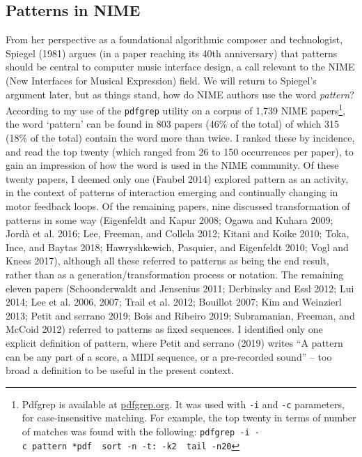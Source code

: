 \documentclass{nime-alternate} %
\begin{document}
\hypertarget{patterns-in-nime}{%
\subsection{Patterns in NIME}\label{patterns-in-nime}}

From her perspective as a foundational algorithmic composer and
technologist, Spiegel (1981) argues (in a paper reaching its 40th
anniversary) that patterns should be central to computer music interface
design, a call relevant to the NIME (New Interfaces for Musical
Expression) field. We will return to Spiegel's argument later, but as
things stand, how do NIME authors use the word \emph{pattern}? According
to my use of the \texttt{pdfgrep} utility on a corpus of 1,739 NIME
papers\footnote{ Pdfgrep is available at
  \href{https://pdfgrep.org/}{pdfgrep.org}. It was used with \texttt{-i}
  and \texttt{-c} parameters, for case-insensitive matching. For
  example, the top twenty in terms of number of matches was found with
  the following:
  \texttt{pdfgrep\ -i\ -c\ pattern\ *pdf\ \textbar{}\ sort\ -n\ -t:\ -k2\ \textbar{}\ tail\ -n20}},
the word `pattern' can be found in 803 papers (46\% of the total) of
which 315 (18\% of the total) contain the word more than twice. I ranked
these by incidence, and read the top twenty (which ranged from 26 to 150
occurrences per paper), to gain an impression of how the word is used in
the NIME community. Of these twenty papers, I deemed only one (Faubel
2014) explored pattern as an activity, in the context of patterns of
interaction emerging and continually changing in motor feedback loops.
Of the remaining papers, nine discussed transformation of patterns in
some way (Eigenfeldt and Kapur 2008; Ogawa and Kuhara 2009; Jordà et al.
2016; Lee, Freeman, and Collela 2012; Kitani and Koike 2010; Toka, Ince,
and Baytas 2018; Hawryshkewich, Pasquier, and Eigenfeldt 2010; Vogl and
Knees 2017), although all these referred to patterns as being the end
result, rather than as a generation/transformation process or notation.
The remaining eleven papers (Schoonderwaldt and Jensenius 2011;
Derbinsky and Essl 2012; Lui 2014; Lee et al. 2006, 2007; Trail et al.
2012; Bouillot 2007; Kim and Weinzierl 2013; Petit and serrano 2019;
Bois and Ribeiro 2019; Subramanian, Freeman, and McCoid 2012) referred
to patterns as fixed sequences. I identified only one explicit
definition of pattern, where Petit and serrano (2019) writes ``A pattern
can be any part of a score, a MIDI sequence, or a pre-recorded sound''
-- too broad a definition to be useful in the present context.
\end{document}
